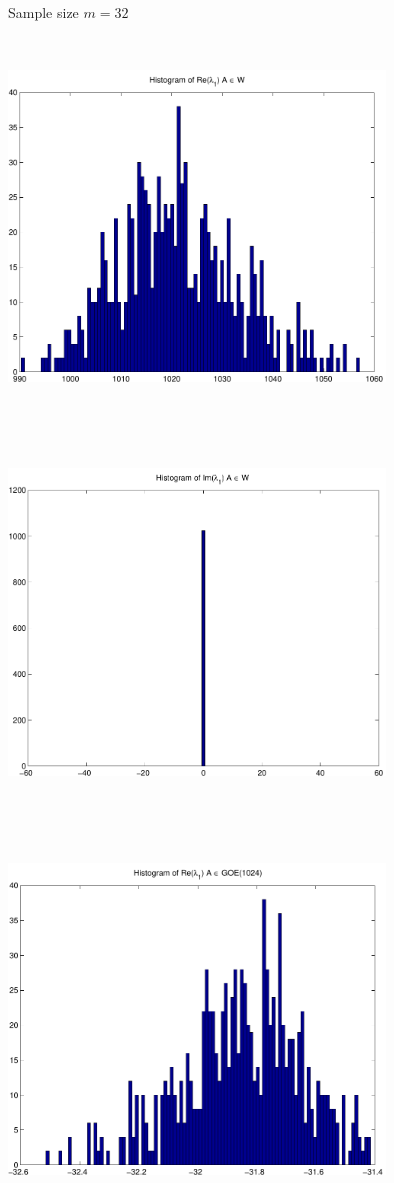 \documentclass[9pt]{article}
\theoremstyle{plain}
\theoremstyle{definition}
\theoremstyle{remark}
\numberwithin{equation}{section}
\begin{document}
Sample size $m = 32$

\includegraphics[width=10.0cm,height=10.0cm]{Re_TraceyWidom.pdf}

\includegraphics[width=10.0cm,height=10.0cm]{Im_TraceyWidom.pdf}

\includegraphics[width=10.0cm,height=10.0cm]{Re_Winger.pdf}
\end{document}
